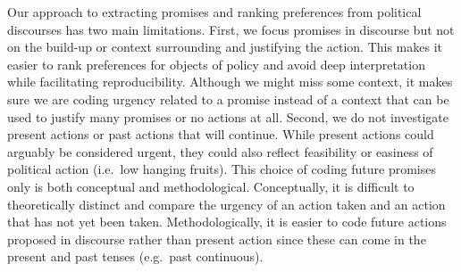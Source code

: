 \documentclass[
]{article}
\begin{document}
Our approach to extracting promises and ranking preferences from
political discourses has two main limitations. First, we focus promises
in discourse but not on the build-up or context surrounding and
justifying the action. This makes it easier to rank preferences for
objects of policy and avoid deep interpretation while facilitating
reproducibility. Although we might miss some context, it makes sure we
are coding urgency related to a promise instead of a context that can be
used to justify many promises or no actions at all. Second, we do not
investigate present actions or past actions that will continue. While
present actions could arguably be considered urgent, they could also
reflect feasibility or easiness of political action (i.e.~low hanging
fruits). This choice of coding future promises only is both conceptual
and methodological. Conceptually, it is difficult to theoretically
distinct and compare the urgency of an action taken and an action that
has not yet been taken. Methodologically, it is easier to code future
actions proposed in discourse rather than present action since these can
come in the present and past tenses (e.g.~past continuous).
\end{document}
